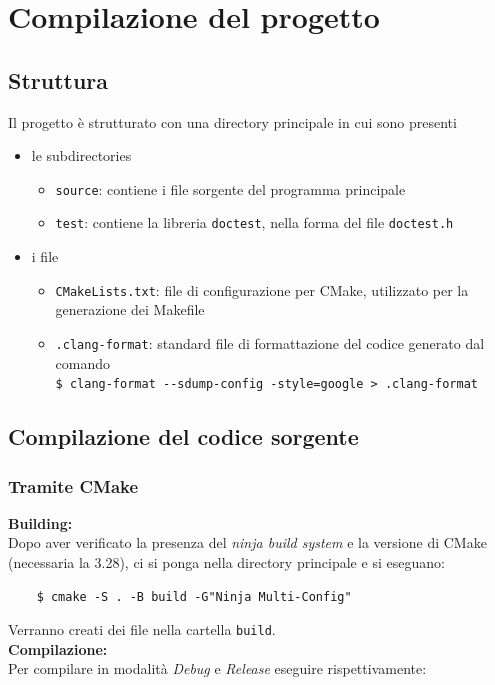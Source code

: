 \section{Compilazione del progetto}
\subsection{Struttura}
Il progetto è strutturato con una directory principale in cui sono presenti
\begin{itemize}
    \item le subdirectories
          \begin{itemize}
              \item \verb|source|: contiene i file sorgente del programma principale
              \item \verb|test|: contiene la libreria \verb|doctest|, nella forma del file \verb|doctest.h|
          \end{itemize}
    \item i file
          \begin{itemize}
              \item \verb|CMakeLists.txt|: file di configurazione per CMake, utilizzato per la generazione dei Makefile
              \item \verb|.clang-format|: standard file di formattazione del codice generato dal comando \\
                    \verb|$ clang-format --sdump-config -style=google > .clang-format|
          \end{itemize}
\end{itemize}

\subsection{Compilazione del codice sorgente}
\subsubsection{Tramite CMake}
\textbf{Building:}
\\
Dopo aver verificato la presenza del \textit{ninja build system} e la versione di CMake (necessaria la 3.28), ci si ponga nella directory principale e si eseguano:
\begin{verbatim}
    $ cmake -S . -B build -G"Ninja Multi-Config"
\end{verbatim}
Verranno creati dei file nella cartella \verb|build|.
\\
\textbf{Compilazione:}
\\
Per compilare in modalità \textit{Debug} e \textit{Release} eseguire rispettivamente:

